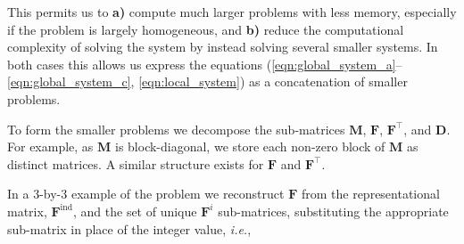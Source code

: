 \noindent
This permits us to \textbf{a)} compute much larger problems with less 
memory, especially if the problem is largely homogeneous, and \textbf{b)} 
reduce the computational complexity of solving the system by instead 
solving several smaller systems. In both cases this allows us express the 
equations (\ref{eqn:global_system_a}--\ref{eqn:global_system_c}, 
\ref{eqn:local_system}) as a concatenation of smaller problems. 

To form the smaller problems we decompose the sub-matrices 
$\textbf{M}$, $\textbf{F}$, $\textbf{F}^{\intercal}$, and $\textbf{D}$. 
For example, as $\textbf{M}$ is block-diagonal, we store each non-zero 
block of $\textbf{M}$ as distinct matrices. A similar structure exists 
for $\textbf{F}$ and $\textbf{F}^{\intercal}$. 

In a 3-by-3 example of the problem we reconstruct $\textbf{F}$ from the 
representational matrix, $\textbf{F}^{\text{ind}}$, and the set of unique
$\textbf{F}^{i}$ sub-matrices, substituting the appropriate sub-matrix in
place of the integer value, \emph{i.e.},
